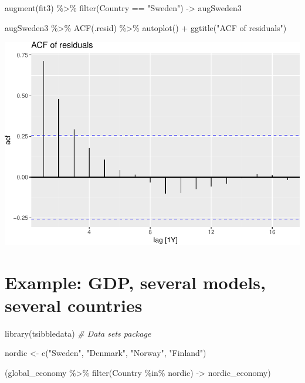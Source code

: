 \documentclass[
]{book}
\newenvironment{Shaded}{\begin{snugshade}}{\end{snugshade}}
\newcommand{\CommentTok}[1]{\textcolor[rgb]{0.56,0.35,0.01}{\textit{#1}}}
\newcommand{\FunctionTok}[1]{\textcolor[rgb]{0.00,0.00,0.00}{#1}}
\newcommand{\NormalTok}[1]{#1}
\newcommand{\OtherTok}[1]{\textcolor[rgb]{0.56,0.35,0.01}{#1}}
\newcommand{\SpecialCharTok}[1]{\textcolor[rgb]{0.00,0.00,0.00}{#1}}
\newcommand{\StringTok}[1]{\textcolor[rgb]{0.31,0.60,0.02}{#1}}
\begin{document}
\begin{Shaded}
\begin{Highlighting}[]
\FunctionTok{augment}\NormalTok{(fit3) }\SpecialCharTok{\%\textgreater{}\%} \FunctionTok{filter}\NormalTok{(Country }\SpecialCharTok{==} \StringTok{"Sweden"}\NormalTok{) }\OtherTok{{-}\textgreater{}}\NormalTok{ augSweden3}

\NormalTok{augSweden3 }\SpecialCharTok{\%\textgreater{}\%}
  \FunctionTok{ACF}\NormalTok{(.resid) }\SpecialCharTok{\%\textgreater{}\%}
  \FunctionTok{autoplot}\NormalTok{() }\SpecialCharTok{+} \FunctionTok{ggtitle}\NormalTok{(}\StringTok{"ACF of residuals"}\NormalTok{)}
\end{Highlighting}
\end{Shaded}

\includegraphics{graphics/unnamed-chunk-72-1.pdf}

\hypertarget{example-gdp-several-models-several-countries}{%
\section{Example: GDP, several models, several countries}\label{example-gdp-several-models-several-countries}}

\begin{Shaded}
\begin{Highlighting}[]
\FunctionTok{library}\NormalTok{(tsibbledata) }\CommentTok{\# Data sets package}

\NormalTok{nordic }\OtherTok{\textless{}{-}} \FunctionTok{c}\NormalTok{(}\StringTok{"Sweden"}\NormalTok{, }\StringTok{"Denmark"}\NormalTok{, }\StringTok{"Norway"}\NormalTok{, }\StringTok{"Finland"}\NormalTok{)}

\NormalTok{(global\_economy }\SpecialCharTok{\%\textgreater{}\%} \FunctionTok{filter}\NormalTok{(Country }\SpecialCharTok{\%in\%}\NormalTok{ nordic) }\OtherTok{{-}\textgreater{}}\NormalTok{ nordic\_economy)}
\end{Highlighting}
\end{Shaded}
\end{document}
